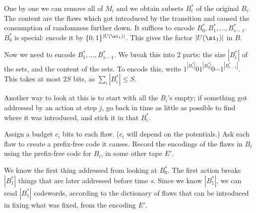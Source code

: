 
One by one we can remove all of $M_i$ and we obtain subsets $B_i^*$ of the original $B_i$. The content are the flaws which got introduced by the transition and caused the consumption of randomness further down. It suffices to encode $B_0^*,B_1^*,\ldots, B_{s-1}^*$. $B_0^*$ is special: encode it by $\{0,1\}^{|U(\si_1)|}$. This gives the factor $|U(\si_1)|$ in $B$.

Now we need to encode $B_1^*,\ldots, B_{s-1}^*$. We break this into 2 parts: the size $|B_i^*|$ of the sets, and the content of the sets. To encode this, write $1^{|B_1^*|}01^{|B_2^*|}0\cdots 1^{|B_{s-1}^*|}$. This takes at most $2S$ bits, as $\sum_i |B_i^*|\le S$.

Another way to look at this is to start with all the $B_i$'s empty; if something got addressed by an action at step $j$, go back in time as little as possible to find where it was introduced, and stick it in that $B_i^*$.

Assign a budget %
$c_i$ bits to each flaw. ($c_i$ will depend on the potentials.) Ask each flaw to create a prefix-free code it causes. %
Record the encodings of the flaws in $B_i$ using the prefix-free code for $B_i$, in some other tape $E'$.

We know the first thing addressed from looking at $B_0^*$. The first action breaks $|B_1^*|$ things that are later addressed before time $s$. Since we know $|B_1^*|$, we can read $|B_1^*|$ codewords, according to the dictionary of flaws that can be introduced in fixing what was fixed, from the encoding $E'$. %

